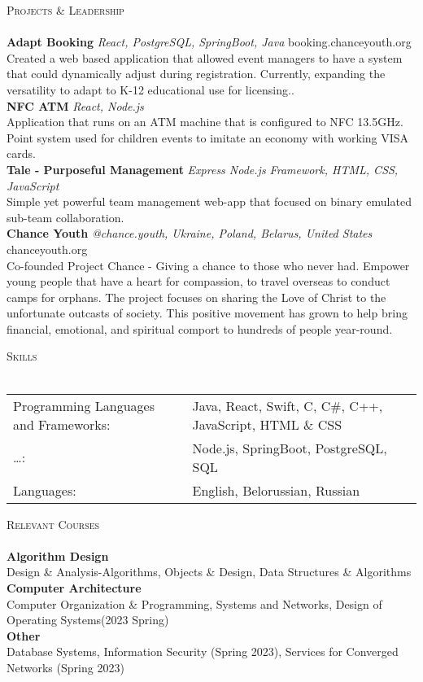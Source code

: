 \documentclass[a4paper]{article}
\newcommand{\lineunder} {
    \vspace*{-8pt} \\
    \hspace*{-18pt} \hrulefill \\
}
\newcommand{\header} [1] {
    {\hspace*{-18pt}\vspace*{6pt} \textsc{#1}}
    \vspace*{-6pt} \lineunder
}
\begin{document}
\header{Projects \& Leadership}
{\textbf{Adapt Booking}} {\sl React, PostgreSQL, SpringBoot, Java} \hfill booking.chanceyouth.org\\
Created a web based application that allowed event managers to have a system that could dynamically adjust during registration. Currently, expanding the versatility to adapt to K-12 educational use for licensing..\\
\vspace*{2mm}
{\textbf{NFC ATM}} {\sl React, Node.js} \\
Application that runs on an ATM machine that is configured to NFC 13.5GHz. Point system used for children events to imitate an economy with working VISA cards.\\
\vspace*{2mm}
{\textbf{Tale - Purposeful Management}} {\sl Express Node.js Framework, HTML, CSS, JavaScript} \\
Simple yet powerful team management web-app that focused on binary emulated sub-team collaboration.\\
\vspace*{2mm}
{\textbf{Chance Youth}} {\sl @chance.youth, Ukraine, Poland, Belarus, United States} \hfill chanceyouth.org\\
Co-founded Project Chance - \textquotedbl{}Giving a chance to those who never had\textquotedbl{}. Empower young people that have a heart for compassion, to travel overseas to conduct camps for orphans. The project focuses on sharing the Love of Christ to the unfortunate outcasts of society. This positive movement has grown to help bring financial, emotional, and spiritual comport to hundreds of people year-round.\\
\vspace*{2mm}

\header{Skills}
\begin{tabular}{ l l }
	Programming Languages and Frameworks: & Java, React, Swift, C, C\#, C++, JavaScript, HTML \& CSS \\
	…:                                  & Node.js, SpringBoot, PostgreSQL, SQL                     \\
	Languages:                            & English, Belorussian, Russian                            \\
\end{tabular}
\vspace{2mm}

\header{Relevant Courses}
\textbf{Algorithm Design}\\
Design \& Analysis-Algorithms, Objects \& Design, Data Structures \& Algorithms\\
\vspace*{2mm}
\textbf{Computer Architecture}\\
Computer Organization \& Programming, Systems and Networks, Design of Operating Systems(2023 Spring)\\
\vspace*{2mm}
\textbf{Other}\\
Database Systems, Information Security (Spring 2023), Services for Converged Networks (Spring 2023)\\
\vspace*{2mm}

\ 
\end{document}

